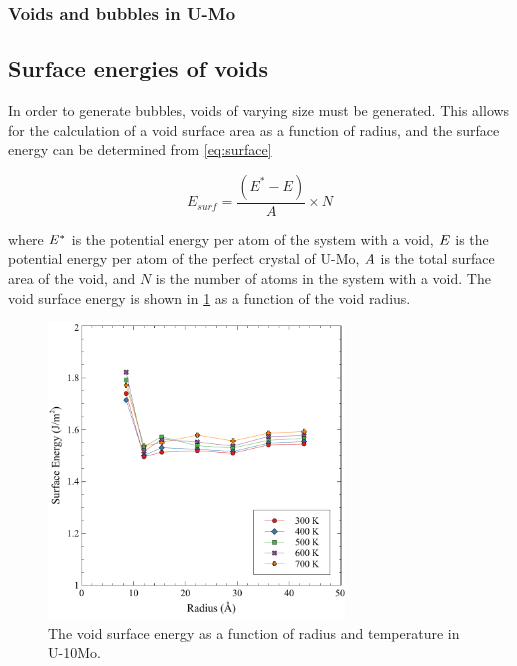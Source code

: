 \documentclass[review]{elsarticle}
\begin{document}
\FloatBarrier

\subsubsection{Voids and bubbles in U-Mo}

\subsection{Surface energies of voids}

In order to generate bubbles, voids of varying size must be generated. This allows for the calculation of a void surface area as a function of radius, and the surface energy can be determined from \cref{eq:surface}

\begin{equation}
\label{eq:surface}
E_{surf}= \frac{(E^{*} - E)}{A} \times N
\end{equation}

\noindent where $\it{E^{*}}$ is the potential energy per atom of the system with a void, $\it{E}$ is the potential energy per atom of the perfect crystal of U-Mo, $\it{A}$ is the total surface area of the void, and $\textit{N}$ is the number of atoms in the system with a void. The void surface energy is shown in \cref{fig:voidE} as a function of the void radius. 

\begin{figure}[h!]
 \centering
 \includegraphics[width=0.7\textwidth]{Esurf} 
 \caption{The void surface energy as a function of radius and temperature in U-10Mo.}
 \label{fig:voidE}
\end{figure}
\end{document}
